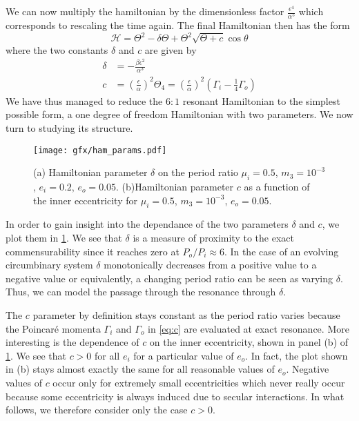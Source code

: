 We can now multiply the hamiltonian by the dimensionless factor 
$\frac{\epsilon^4}{\alpha^5}$ which corresponds to rescaling the time
again. The final Hamiltonian then has the form
\begin{equation}
    \mathcal{H}= \Theta^2-\delta\Theta +
     \Theta^2\sqrt{\Theta+ c}
    \cos\theta
    \label{eq:hamiltonian_final}
\end{equation}
where the two constants $\delta$ and $c$ are given by
\begin{align}
    \delta&= -\frac{\beta\epsilon^2}{\alpha^3}\label{eq:delta}\\
    c&= \left( \frac{\epsilon}{\alpha} \right)^2 \Theta_4
    =\left( \frac{\epsilon}{\alpha} \right)^2\left(\Gamma_i- \frac{1}{4}
    \Gamma_o\right)\label{eq:c}
\end{align}
We have thus managed to reduce the $6:1$ resonant Hamiltonian to the
simplest possible form, a one degree of freedom Hamiltonian with two
parameters. We now turn to studying its structure.
\begin{figure}[htb]
\centering
    \texttt{[image: gfx/ham\_params.pdf]}
    \caption{(a) Hamiltonian parameter $\delta$
     on the period ratio $\mu_i=0.5$, $m_3=10^{-3}$, $e_i=0.2$, $e_o=0.05$.
     (b)Hamiltonian parameter $c$ as a function of the inner
     eccentricity for $\mu_i=0.5$, $m_3=10^{-3}$, $e_o=0.05$.}
\label{fig:ham_params}
\end{figure}
In order to gain insight into the dependance of the two parameters $\delta$
and $c$, we plot them in \cref{fig:ham_params}. We see that $\delta$ is a 
measure of proximity to the exact commensurability since it reaches 
zero at $P_o/P_i\approx 6$. In the case of an evolving circumbinary 
system $\delta$ monotonically decreases from a positive value to a negative
value or equivalently, a changing period ratio can be seen as varying
$\delta$. Thus, we can model the passage through the resonance through 
$\delta$.  

The $c$ parameter by definition stays constant as the period ratio varies
because the Poincaré momenta $\Gamma_i$ and $\Gamma_o$ in \cref{eq:c}
are evaluated at exact resonance. More interesting is the dependence
of $c$ on the inner eccentricity, shown in panel (b) of \cref{fig:ham_params}.
We see that $c>0$ for all $e_i$ for a particular value of $e_o$. In fact, the
plot shown in (b) stays almost exactly the same for all reasonable values
of $e_o$. Negative values of $c$ occur only for extremely small eccentricities
which never really occur because some eccentricity is always induced due to 
secular interactions. In what follows, we therefore consider only the case
$c>0$.


